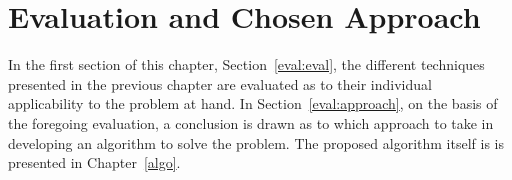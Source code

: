
\cleardoublepage
\chapter{Evaluation and Chosen Approach}
\label{eval}

In the first section of this chapter, Section~\ref{eval:eval}, the
different techniques presented in the previous chapter are evaluated
as to their individual applicability to the problem at hand.  In
Section~\ref{eval:approach}, on the basis of the foregoing
evaluation, a conclusion is drawn as to which approach to take in
developing an algorithm to solve the problem.  The proposed algorithm
itself is is presented in Chapter~\ref{algo}.



